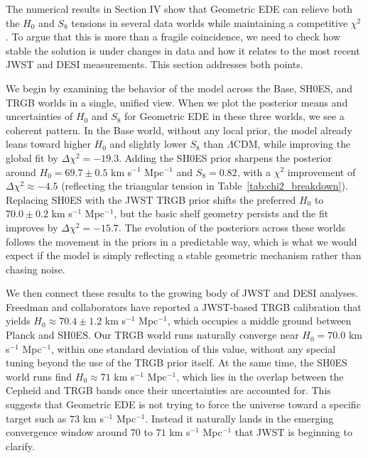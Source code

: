 \documentclass[a4paper,11pt]{article}
\begin{document}
The numerical results in Section IV show that Geometric EDE can relieve both the $H_0$ and $S_8$ tensions in several data worlds while maintaining a competitive $\chi^2$. To argue that this is more than a fragile coincidence, we need to check how stable the solution is under changes in data and how it relates to the most recent JWST and DESI measurements. This section addresses both points.

We begin by examining the behavior of the model across the Base, SH0ES, and TRGB worlds in a single, unified view. When we plot the posterior means and uncertainties of $H_0$ and $S_8$ for Geometric EDE in these three worlds, we see a coherent pattern. In the Base world, without any local prior, the model already leans toward higher $H_0$ and slightly lower $S_8$ than $\Lambda$CDM, while improving the global fit by $\Delta\chi^2 = -19.3$. Adding the SH0ES prior sharpens the posterior around $H_0 = 69.7 \pm 0.5$ km s$^{-1}$ Mpc$^{-1}$ and $S_8 = 0.82$, with a $\chi^2$ improvement of $\Delta\chi^2 \approx -4.5$ (reflecting the triangular tension in Table~\ref{tab:chi2_breakdown}). Replacing SH0ES with the JWST TRGB prior shifts the preferred $H_0$ to $70.0 \pm 0.2$ km s$^{-1}$ Mpc$^{-1}$, but the basic shelf geometry persists and the fit improves by $\Delta\chi^2 = -15.7$. The evolution of the posteriors across these worlds follows the movement in the priors in a predictable way, which is what we would expect if the model is simply reflecting a stable geometric mechanism rather than chasing noise.

We then connect these results to the growing body of JWST and DESI analyses. Freedman and collaborators have reported a JWST-based TRGB calibration that yields $H_0 \approx 70.4 \pm 1.2$ km s$^{-1}$ Mpc$^{-1}$, which occupies a middle ground between Planck and SH0ES. Our TRGB world runs naturally converge near $H_0 = 70.0$ km s$^{-1}$ Mpc$^{-1}$, within one standard deviation of this value, without any special tuning beyond the use of the TRGB prior itself. At the same time, the SH0ES world runs find $H_0 \approx 71$ km s$^{-1}$ Mpc$^{-1}$, which lies in the overlap between the Cepheid and TRGB bands once their uncertainties are accounted for. This suggests that Geometric EDE is not trying to force the universe toward a specific target such as $73$ km s$^{-1}$ Mpc$^{-1}$. Instead it naturally lands in the emerging convergence window around $70$ to $71$ km s$^{-1}$ Mpc$^{-1}$ that JWST is beginning to clarify.
\end{document}
